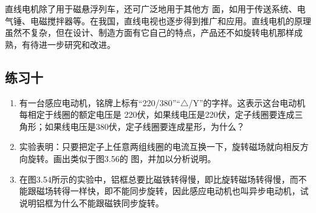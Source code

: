 直线电机除了用于磁悬浮列车，还可广泛地用于其他方
面，如用于传送系统、电气锤、电磁搅拌器等。在我国，直线电视也逐步得到推广和应用。直线电机的原理虽然不复杂，但在设计、制造方面有它自己的特点，产品还不如旋转电机那样成熟，有待进一步研究和改进。

\subsection*{练习十}
\begin{enumerate}
    \item 有一台感应电动机，铭牌上标有“220/380”“$\triangle$/Y”的字祥。这表示这台电动机每相定于线圈的额定电压是 220伏，如果线电压是220伏，定子线圈要连成三角形；如果线电压是380伏，定子线圈要连成星形，为什么？
    \item 实验表明：只要把定子上任意两组线圈的电流互换一下，旋转磁场就向相反方向旋转。画出类似于图3.56的
    图，并加以分析说明。
    \item 在图3.54所示的实验中，铝框总要比磁铁转得慢，即比旋转磁场转得慢，而不能跟磁场转得一样快，即不能同步旋转，因此感应电动机也叫异步电动机，试说明铝框为什么不能跟磁铁同步旋转。
\end{enumerate}

